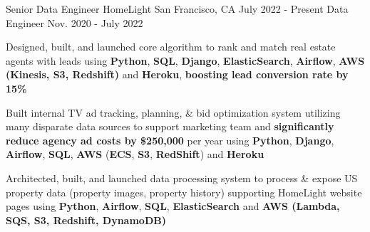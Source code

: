 

\begin{cventries}

\cventryupdate
    {Senior Data Engineer} %
    {HomeLight} %
    {San Francisco, CA} %
    {July 2022 - Present} %
    {Data Engineer} %
    {Nov. 2020 - July 2022} %
    {
      \begin{cvitems} %
        \item{Designed, built, and launched core algorithm to rank and match real estate agents with leads using \textbf{Python}, \textbf{SQL}, \textbf{Django}, \textbf{ElasticSearch}, \textbf{Airflow}, \textbf{AWS (Kinesis, S3, Redshift)} and \textbf{Heroku}, \textbf{boosting lead conversion rate by 15\%}}
        \item{Built internal TV ad tracking, planning, \& bid optimization system utilizing many disparate data sources to support marketing team and \textbf{significantly reduce agency ad costs by \$250,000} per year using \textbf{Python}, \textbf{Django}, \textbf{Airflow}, \textbf{SQL}, \textbf{AWS} (\textbf{ECS}, \textbf{S3}, \textbf{RedShift}) and \textbf{Heroku}}
         \item{Architected, built, and launched data processing system to process \& expose US property data (property images, property history) supporting HomeLight website pages using \textbf{Python}, \textbf{Airflow}, \textbf{SQL}, \textbf{ElasticSearch} and \textbf{AWS (Lambda, SQS, S3, Redshift, DynamoDB)}}

\end{cvitems}}
\end{cventries}
